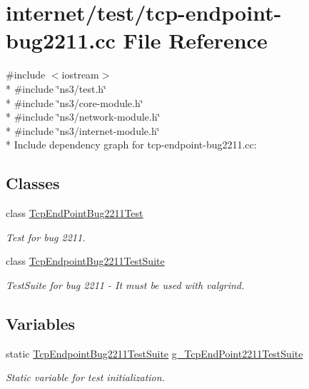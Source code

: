 \hypertarget{tcp-endpoint-bug2211_8cc}{}\section{internet/test/tcp-\/endpoint-\/bug2211.cc File Reference}
\label{tcp-endpoint-bug2211_8cc}
{\ttfamily \#include $<$iostream$>$}\\*
{\ttfamily \#include \char`\"{}ns3/test.\+h\char`\"{}}\\*
{\ttfamily \#include \char`\"{}ns3/core-\/module.\+h\char`\"{}}\\*
{\ttfamily \#include \char`\"{}ns3/network-\/module.\+h\char`\"{}}\\*
{\ttfamily \#include \char`\"{}ns3/internet-\/module.\+h\char`\"{}}\\*
Include dependency graph for tcp-\/endpoint-\/bug2211.cc\+:
\subsection*{Classes}
\begin{DoxyCompactItemize}
\item 
class \hyperlink{classTcpEndPointBug2211Test}{Tcp\+End\+Point\+Bug2211\+Test}
\begin{DoxyCompactList}\small\item\em Test for bug 2211. \end{DoxyCompactList}\item 
class \hyperlink{classTcpEndpointBug2211TestSuite}{Tcp\+Endpoint\+Bug2211\+Test\+Suite}
\begin{DoxyCompactList}\small\item\em Test\+Suite for bug 2211 -\/ It must be used with valgrind. \end{DoxyCompactList}\end{DoxyCompactItemize}
\subsection*{Variables}
\begin{DoxyCompactItemize}
\item 
static \hyperlink{classTcpEndpointBug2211TestSuite}{Tcp\+Endpoint\+Bug2211\+Test\+Suite} \hyperlink{tcp-endpoint-bug2211_8cc_ad7ea53a8f4691e6439f2d9fb1411d3b2}{g\+\_\+\+Tcp\+End\+Point2211\+Test\+Suite}
\begin{DoxyCompactList}\small\item\em Static variable for test initialization. \end{DoxyCompactList}\end{DoxyCompactItemize}


